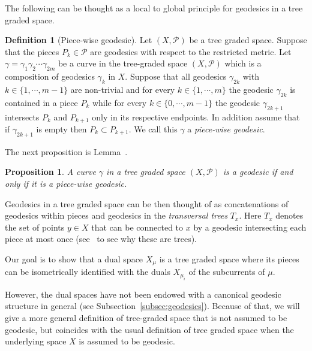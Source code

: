 \documentclass[12pt,article]{amsart}
\numberwithin{equation}{section}
\numberwithin{figure}{section}
\newtheorem{proposition}[equation]{Proposition}
\theoremstyle{definition}
\newtheorem{definition}[equation]{Definition}
\theoremstyle{plain}
\begin{document}
The following can be thought as a local to global principle for geodesics in a tree graded space.
\begin{definition}[Piece-wise geodesic]
Let $(X,\mathcal{P})$ be a tree graded space.
Suppose that the pieces $P_k \in \mathcal{P}$ are geodesics with respect to the restricted metric.
Let $\gamma=\gamma_1 \gamma_2 \cdots \gamma_{2m}$ be a curve in the tree-graded space $(X,\mathcal{P})$ which is a composition of geodesics $\gamma_k$ in $X$. 
Suppose that all geodesics $\gamma_{2k}$ with $k \in \{1, \cdots, m-1 \}$ are non-trivial and for every $k \in \{1, \cdots, m\}$
the geodesic $\gamma_{2k}$ is contained in a piece $P_k$ while for every $k \in \{0, \cdots,m-1\}$ the geodesic $\gamma_{2k+1}$
intersects $P_k$ and $P_{k+1}$ only in its respective endpoints. In addition assume that if $\gamma_{2k+1}$ is empty then
$P_k \subset P_{k+1}$. We call this $\gamma$ a \emph{piece-wise geodesic}.
\end{definition}

The next proposition is Lemma~\cite[Lemma~2.28]{DS05:Treegraded}.

\begin{proposition}
A curve $\gamma$ in a tree graded space $(X,\mathcal{P})$ is a geodesic if and only if it is a piece-wise geodesic.
\label{prop:geodesictreegraded}
\end{proposition}

Geodesics in a tree graded space can be then thought of as concatenations of geodesics within pieces and geodesics in the \emph{transversal trees} $T_x$. Here $T_x$ denotes the set of points $y \in X$ that can be connected to $x$ by a geodesic intersecting each piece at most once (see~\cite[Lemma~2.14]{DS05:Treegraded} to see why these are trees). 

Our goal is to show that a dual space $X_{\mu}$ is a tree graded space where its pieces can be isometrically identified with the duals $X_{\mu_i}$ of the subcurrents of $\mu$.

However, the dual spaces have not been endowed with a canonical geodesic structure in general (see Subsection~\ref{subsec:geodesics}).
Because of that, we will give a more general definition of tree-graded space that is not assumed to be geodesic, but coincides with the usual definition of tree graded space when the underlying space $X$ is assumed to be geodesic.
\end{document}
